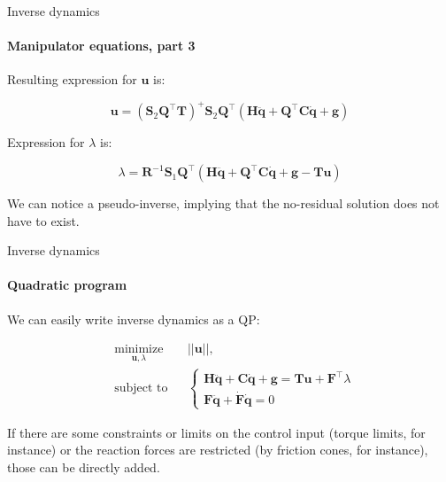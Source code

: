 \documentclass{beamer}
\begin{document}
\begin{frame}{Inverse dynamics}
\framesubtitle{Manipulator equations, part 3}
\begin{flushleft}

Resulting expression for $\mathbf{u}$ is:

\begin{equation}
    \mathbf{u} = 
    (\mathbf{S}_2\mathbf{Q}^\top\mathbf{T})^+ \mathbf{S}_2 \mathbf{Q}^\top (\mathbf{H}\ddot{\mathbf{q}} + \mathbf{Q}^\top\mathbf{C}\dot{\mathbf{q}} + \mathbf{g})
\end{equation}

Expression for $\lambda$ is:

\begin{equation}
\lambda = \mathbf{R}^{-1} \mathbf{S}_1 \mathbf{Q}^\top (\mathbf{H}\ddot{\mathbf{q}} + \mathbf{Q}^\top\mathbf{C}\dot{\mathbf{q}} + \mathbf{g} - \mathbf{T}\mathbf{u})
\end{equation}

We can notice a pseudo-inverse, implying that the no-residual solution does not have to exist.

\end{flushleft}
\end{frame}



\begin{frame}{Inverse dynamics}
\framesubtitle{Quadratic program}
\begin{flushleft}

We can easily write inverse dynamics as a QP:


\begin{equation}
\begin{aligned}
& \underset{\mathbf{u}, \lambda}{\text{minimize}}
& & ||\mathbf{u}||, \\
& \text{subject to}
& & \begin{cases}
    \mathbf{H}\ddot{\mathbf{q}} + \mathbf{C}\dot{\mathbf{q}} + \mathbf{g} = \mathbf{T}\mathbf{u} + \mathbf{F}^\top \lambda \\
    \mathbf{F}\ddot{\mathbf{q}} + \dot{\mathbf{F}}\dot{\mathbf{q}} = 0
    \end{cases}
\end{aligned}
\end{equation}

If there are some constraints or limits on the control input (torque limits, for instance) or the reaction forces are restricted (by friction cones, for instance), those can be directly added.

\end{flushleft}
\end{frame}
\end{document}

